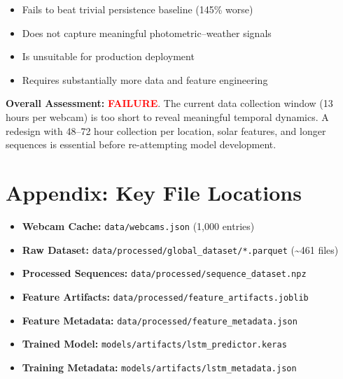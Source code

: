 \documentclass[11pt,a4paper]{article}
\begin{document}
\begin{itemize}
    \item[\times] Fails to beat trivial persistence baseline (145\% worse)
    \item[\times] Does not capture meaningful photometric--weather signals
    \item[\times] Is unsuitable for production deployment
    \item[\times] Requires substantially more data and feature engineering
\end{itemize}

\textbf{Overall Assessment:} \textcolor{red}{\textbf{FAILURE}}. The current data collection window (13 hours per webcam) is too short to reveal meaningful temporal dynamics. A redesign with 48--72 hour collection per location, solar features, and longer sequences is essential before re-attempting model development.

\newpage

\section{Appendix: Key File Locations}

\begin{itemize}
    \item \textbf{Webcam Cache:} \texttt{data/webcams.json} (1,000 entries)
    \item \textbf{Raw Dataset:} \texttt{data/processed/global\_dataset/*.parquet} (\textasciitilde461 files)
    \item \textbf{Processed Sequences:} \texttt{data/processed/sequence\_dataset.npz}
    \item \textbf{Feature Artifacts:} \texttt{data/processed/feature\_artifacts.joblib}
    \item \textbf{Feature Metadata:} \texttt{data/processed/feature\_metadata.json}
    \item \textbf{Trained Model:} \texttt{models/artifacts/lstm\_predictor.keras}
    \item \textbf{Training Metadata:} \texttt{models/artifacts/lstm\_metadata.json}
\end{itemize}
\end{document}
